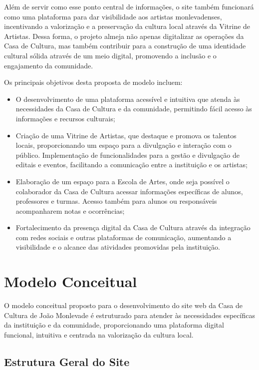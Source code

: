 Além de servir como esse ponto central de informações, o site também funcionará como uma plataforma para dar visibilidade aos artistas monlevadenses, incentivando a valorização e a preservação da cultura local através da Vitrine de Artistas. Dessa forma, o projeto almeja não apenas digitalizar as operações da Casa de Cultura, mas também contribuir para a construção de uma identidade cultural sólida através de um meio digital, promovendo a inclusão e o engajamento da comunidade.

Os principais objetivos desta proposta de modelo incluem:

\begin{itemize}
	\item O desenvolvimento de uma plataforma acessível e intuitiva que atenda às necessidades da Casa de Cultura e da comunidade, permitindo fácil acesso às informações e recursos culturais;
	\item Criação de uma Vitrine de Artistas, que destaque e promova os talentos locais, proporcionando um espaço para a divulgação e interação com o público.
	Implementação de funcionalidades para a gestão e divulgação de editais e eventos, facilitando a comunicação entre a instituição e os artistas;
	\item Elaboração de um espaço para a Escola de Artes, onde seja possível o colaborador da Casa de Cultura acessar informações específicas de alunos, professores e turmas. Acesso também para alunos ou responsáveis acompanharem notas e ocorrências;
	\item Fortalecimento da presença digital da Casa de Cultura através da integração com redes sociais e outras plataformas de comunicação, aumentando a visibilidade e o alcance das atividades promovidas pela instituição.
\end{itemize}

\section{Modelo Conceitual}

O modelo conceitual proposto para o desenvolvimento do site web da Casa de Cultura de João Monlevade é estruturado para atender às necessidades específicas da instituição e da comunidade, proporcionando uma plataforma digital funcional, intuitiva e centrada na valorização da cultura local.

\subsection{Estrutura Geral do Site}

